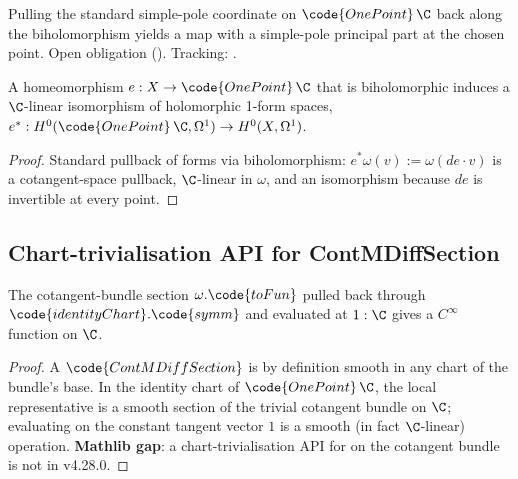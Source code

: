\begin{lemma}
\label{lem:complex-simple-pole-principal-part-of-biholomorph-one-point}
Pulling the standard simple-pole coordinate on \(\code{OnePoint}\,\C\) back along
the biholomorphism yields a map with a simple-pole principal part at the chosen
point. Open obligation ().
Tracking: .
\end{lemma}

\begin{lemma}
\label{lem:holomorphic-one-form-pullback-via-biholo}
A homeomorphism \(e:X\to\code{OnePoint}\,\C\) that is biholomorphic
induces a \(\C\)-linear isomorphism of holomorphic 1-form spaces,
\(e^{*}:H^{0}(\code{OnePoint}\,\C,\Omega^{1})\to H^{0}(X,\Omega^{1})\).
\leanok
\end{lemma}
\begin{proof}
\leanok
Standard pullback of forms via biholomorphism: \(e^*\omega(v):=\omega(de\cdot v)\)
is a cotangent-space pullback, \(\C\)-linear in \(\omega\), and an
isomorphism because \(de\) is invertible at every point.
\end{proof}

\subsection{Chart-trivialisation API for ContMDiffSection}
\label{sec:chart-trivialisation-API}

\begin{lemma}
\label{lem:section-localRepr-identity-chart-contdiff}
The cotangent-bundle section \(\omega.\code{toFun}\) pulled back through
\(\code{identityChart}.\code{symm}\) and evaluated at \(1:\C\) gives a
\(C^{\infty}\) function on \(\C\).
\leanok
\end{lemma}
\begin{proof}
\leanok
A \(\code{ContMDiffSection}\) is by definition smooth in any chart of
the bundle's base. In the identity chart of \(\code{OnePoint}\,\C\), the
local representative is a smooth section of the trivial cotangent
bundle on \(\C\); evaluating on the constant tangent vector \(1\) is
a smooth (in fact \(\C\)-linear) operation. \textbf{Mathlib gap}: a
chart-trivialisation API for  on the cotangent
bundle is not in v4.28.0.
\end{proof}


